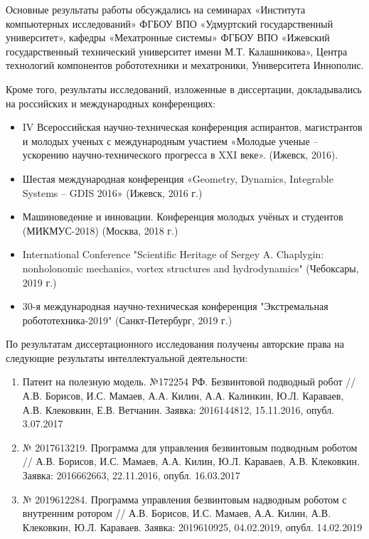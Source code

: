 {\probation}
Основные результаты работы обсуждались на семинарах «Института компьютерных исследований» ФГБОУ ВПО «Удмуртский государственный университет», кафедры «Мехатронные системы» ФГБОУ ВПО «Ижевский государственный технический университет имени М.Т. Калашникова», Центра технологий компонентов робототехники и мехатроники, Университета Иннополис.

Кроме того, результаты исследований, изложенные в диссертации, докладывались на российских и международных конференциях:
\begin{itemize}
	\item IV Всероссийская научно-техническая конференция аспирантов, магистрантов и молодых ученых с международным участием «Молодые ученые -- ускорению научно-технического прогресса в XXI веке». (Ижевск, 2016).
	\item Шестая международная конференция «Geometry, Dynamics, Integrable Systems -- GDIS 2016» (Ижевск, 2016 г.)
	\item Машиноведение и инновации. Конференция молодых учёных и студентов (МИКМУС-2018) (Москва, 2018 г.)
	\item International Conference "Scientific Heritage of Sergey A. Chaplygin: nonholonomic mechanics, vortex structures and hydrodynamics" (Чебоксары, 2019 г.)
	\item 30-я международная научно-техническая конференция "Экстремальная робототехника-2019" (Санкт-Петербург, 2019 г.)	
\end{itemize}

По результатам диссертационного исследования получены авторские права на следующие результаты интеллектуальной деятельности:
\begin{enumerate}
	
	\item Патент на полезную модель. №172254 РФ. Безвинтовой подводный робот //  А.В. Борисов, И.С. Мамаев, А.А. Килин, А.А. Калинкин, Ю.Л. Караваев, А.В. Клековкин, Е.В. Ветчанин. Заявка: 2016144812, 15.11.2016, опубл. 3.07.2017
	
	\item № 2017613219. Программа для управления безвинтовым подводным роботом // А.В. Борисов, И.С. Мамаев, А.А. Килин, Ю.Л. Караваев, А.В. Клековкин. Заявка: 2016662663, 22.11.2016, опубл. 16.03.2017
	
	\item № 2019612284. Программа управления безвинтовым надводным роботом с внутренним ротором // А.В. Борисов, И.С. Мамаев, А.А. Килин, А.В. Клековкин, Ю.Л. Караваев. Заявка: 2019610925, 04.02.2019, опубл. 14.02.2019
	
\end{enumerate}

